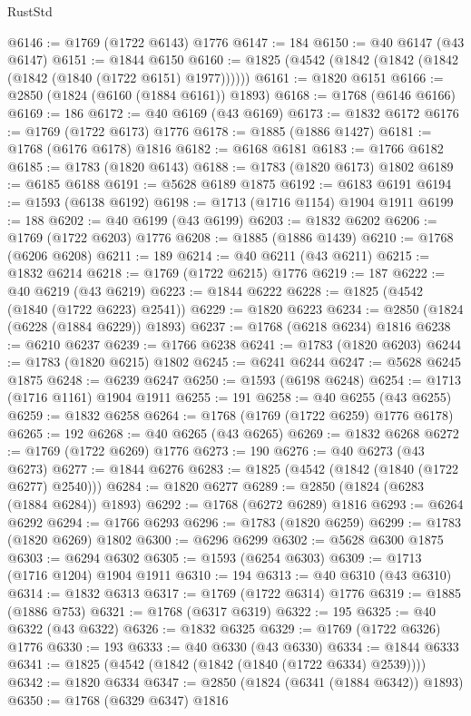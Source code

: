 \begin{lexlean}{RustStd}
\begin{coremodule}
{\begin{coremodule}
{{{{{{{{{{{{{{{{{{{{{{{{{{{{{{{{{{{{{{{{{{{{{{{@6146 := @1769 (@1722 @6143) @1776
@6147 := 184
@6150 := @40 @6147 (@43 @6147)
@6151 := @1844 @6150
@6160 := @1825 (@4542 (@1842 (@1842 (@1842 (@1842 (@1840 (@1722 @6151) @1977))))))
@6161 := @1820 @6151
@6166 := @2850 (@1824 (@6160 (@1884 @6161)) @1893)
@6168 := @1768 (@6146 @6166)
@6169 := 186
@6172 := @40 @6169 (@43 @6169)
@6173 := @1832 @6172
@6176 := @1769 (@1722 @6173) @1776
@6178 := @1885 (@1886 @1427)
@6181 := @1768 (@6176 @6178) @1816
@6182 := @6168 @6181
@6183 := @1766 @6182
@6185 := @1783 (@1820 @6143)
@6188 := @1783 (@1820 @6173) @1802
@6189 := @6185 @6188
@6191 := @5628 @6189 @1875
@6192 := @6183 @6191
@6194 := @1593 (@6138 @6192)
@6198 := @1713 (@1716 @1154) @1904 @1911
@6199 := 188
@6202 := @40 @6199 (@43 @6199)
@6203 := @1832 @6202
@6206 := @1769 (@1722 @6203) @1776
@6208 := @1885 (@1886 @1439)
@6210 := @1768 (@6206 @6208)
@6211 := 189
@6214 := @40 @6211 (@43 @6211)
@6215 := @1832 @6214
@6218 := @1769 (@1722 @6215) @1776
@6219 := 187
@6222 := @40 @6219 (@43 @6219)
@6223 := @1844 @6222
@6228 := @1825 (@4542 (@1840 (@1722 @6223) @2541))
@6229 := @1820 @6223
@6234 := @2850 (@1824 (@6228 (@1884 @6229)) @1893)
@6237 := @1768 (@6218 @6234) @1816
@6238 := @6210 @6237
@6239 := @1766 @6238
@6241 := @1783 (@1820 @6203)
@6244 := @1783 (@1820 @6215) @1802
@6245 := @6241 @6244
@6247 := @5628 @6245 @1875
@6248 := @6239 @6247
@6250 := @1593 (@6198 @6248)
@6254 := @1713 (@1716 @1161) @1904 @1911
@6255 := 191
@6258 := @40 @6255 (@43 @6255)
@6259 := @1832 @6258
@6264 := @1768 (@1769 (@1722 @6259) @1776 @6178)
@6265 := 192
@6268 := @40 @6265 (@43 @6265)
@6269 := @1832 @6268
@6272 := @1769 (@1722 @6269) @1776
@6273 := 190
@6276 := @40 @6273 (@43 @6273)
@6277 := @1844 @6276
@6283 := @1825 (@4542 (@1842 (@1840 (@1722 @6277) @2540)))
@6284 := @1820 @6277
@6289 := @2850 (@1824 (@6283 (@1884 @6284)) @1893)
@6292 := @1768 (@6272 @6289) @1816
@6293 := @6264 @6292
@6294 := @1766 @6293
@6296 := @1783 (@1820 @6259)
@6299 := @1783 (@1820 @6269) @1802
@6300 := @6296 @6299
@6302 := @5628 @6300 @1875
@6303 := @6294 @6302
@6305 := @1593 (@6254 @6303)
@6309 := @1713 (@1716 @1204) @1904 @1911
@6310 := 194
@6313 := @40 @6310 (@43 @6310)
@6314 := @1832 @6313
@6317 := @1769 (@1722 @6314) @1776
@6319 := @1885 (@1886 @753)
@6321 := @1768 (@6317 @6319)
@6322 := 195
@6325 := @40 @6322 (@43 @6322)
@6326 := @1832 @6325
@6329 := @1769 (@1722 @6326) @1776
@6330 := 193
@6333 := @40 @6330 (@43 @6330)
@6334 := @1844 @6333
@6341 := @1825 (@4542 (@1842 (@1842 (@1840 (@1722 @6334) @2539))))
@6342 := @1820 @6334
@6347 := @2850 (@1824 (@6341 (@1884 @6342)) @1893)
@6350 := @1768 (@6329 @6347) @1816
}}}}}}}}}}}}}}}}}}}}}}}}}}}}}}}}}}}}}}}}}}}}}}}
\end{coremodule}}
\end{coremodule}
\end{lexlean}
